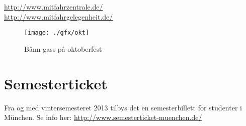 \url{http://www.mitfahrzentrale.de/} \\
\url{http://www.mitfahrgelegenheit.de/}


\begin{figure}[h]
\center
\texttt{[image: ./gfx/okt]}
\caption{Bånn gass på oktoberfest}
\end{figure}

\section{Semesterticket}
Fra og med vintersemesteret 2013 tilbys det en semesterbillett for studenter i München. Se info her: \url{http://www.semesterticket-muenchen.de/}